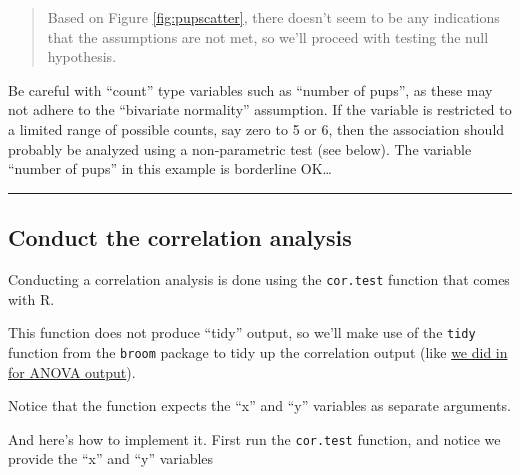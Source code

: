 \documentclass[
]{book}
\newenvironment{Shaded}{\begin{snugshade}}{\end{snugshade}}
\newcommand{\AttributeTok}[1]{\textcolor[rgb]{0.13,0.29,0.53}{#1}}
\newcommand{\FloatTok}[1]{\textcolor[rgb]{0.00,0.00,0.81}{#1}}
\newcommand{\FunctionTok}[1]{\textcolor[rgb]{0.13,0.29,0.53}{\textbf{#1}}}
\newcommand{\NormalTok}[1]{#1}
\newcommand{\OtherTok}[1]{\textcolor[rgb]{0.56,0.35,0.01}{#1}}
\newcommand{\SpecialCharTok}[1]{\textcolor[rgb]{0.81,0.36,0.00}{\textbf{#1}}}
\newcommand{\StringTok}[1]{\textcolor[rgb]{0.31,0.60,0.02}{#1}}
\begin{document}
\begin{quote}
Based on Figure \ref{fig:pupscatter}, there doesn't seem to be any indications that the assumptions are not met, so we'll proceed with testing the null hypothesis.
\end{quote}

Be careful with ``count'' type variables such as ``number of pups'', as these may not adhere to the ``bivariate normality'' assumption. If the variable is restricted to a limited range of possible counts, say zero to 5 or 6, then the association should probably be analyzed using a non-parametric test (see below). The variable ``number of pups'' in this example is borderline OK\ldots{}

\begin{center}\rule{0.5\linewidth}{0.5pt}\end{center}

\subsection{Conduct the correlation analysis}\label{do_corr}

Conducting a correlation analysis is done using the \texttt{cor.test} function that comes with R.

This function does not produce ``tidy'' output, so we'll make use of the \texttt{tidy} function from the \texttt{broom} package to tidy up the correlation output (like \hyperref[createanovatable]{we did in for ANOVA output}).

Notice that the function expects the ``x'' and ``y'' variables as separate arguments.

And here's how to implement it. First run the \texttt{cor.test} function, and notice we provide the ``x'' and ``y'' variables

\begin{Shaded}
\end{Shaded}
\end{document}
